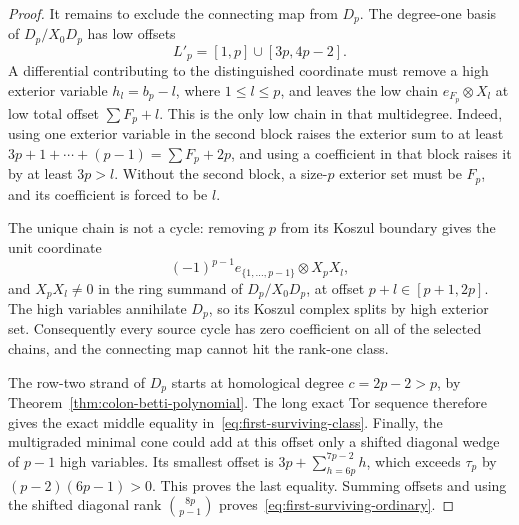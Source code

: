 \documentclass[11pt]{article}
\theoremstyle{definition}
\theoremstyle{remark}
\begin{document}
\begin{proof}
It remains to exclude the connecting map from \(D_p\). The degree-one basis of
\(D_p/X_0D_p\) has low offsets
\[
L'_p=[1,p]\cup[3p,4p-2].
\]
A differential contributing to the distinguished coordinate must remove a high exterior variable
\(h_l=b_p-l\), where \(1\le l\le p\), and leaves the low chain
\(e_{F_p}\otimes X_l\) at low total offset \(\sum F_p+l\). This is the only low chain in that
multidegree. Indeed, using one exterior variable in the second block raises the exterior sum to
at least \(3p+1+\cdots+(p-1)=\sum F_p+2p\), and using a coefficient in that block raises it by at
least \(3p>l\). Without the second block, a size-\(p\) exterior set must be \(F_p\), and its
coefficient is forced to be \(l\).

The unique chain is not a cycle: removing \(p\) from its Koszul boundary gives the unit coordinate
\[
(-1)^{p-1}e_{\{1,\ldots,p-1\}}\otimes X_pX_l,
\]
and \(X_pX_l\ne0\) in the ring summand of \(D_p/X_0D_p\), at offset
\(p+l\in[p+1,2p]\). The high variables annihilate \(D_p\), so its Koszul complex splits by high
exterior set. Consequently every source cycle has zero coefficient on all of the selected chains,
and the connecting map cannot hit the rank-one class.

The row-two strand of \(D_p\) starts at homological degree \(c=2p-2>p\), by
Theorem~\ref{thm:colon-betti-polynomial}. The long exact Tor sequence therefore gives the exact
middle equality in~\eqref{eq:first-surviving-class}. Finally, the multigraded minimal cone could
add at this offset only a shifted diagonal wedge of \(p-1\) high variables. Its smallest offset is
\(3p+\sum_{h=6p}^{7p-2}h\), which exceeds \(\tau_p\) by
\((p-2)(6p-1)>0\). This proves the last equality. Summing offsets and using the shifted diagonal
rank \(\binom{8p}{p-1}\) proves~\eqref{eq:first-surviving-ordinary}.
\end{proof}
\end{document}
